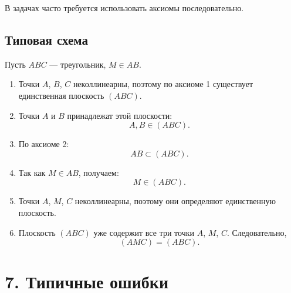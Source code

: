 \documentclass[a4paper,12pt]{article}
\newcommand{\plane}[1]{(#1)}
\begin{document}
В задачах часто требуется использовать аксиомы последовательно.

\subsection*{\textcolor{accent}{Типовая схема}}

Пусть $ABC$ --- треугольник, $M\in AB$.

\begin{enumerate}
  \item Точки $A$, $B$, $C$ неколлинеарны, поэтому по аксиоме 1 существует единственная плоскость $\plane{ABC}$.
  \item Точки $A$ и $B$ принадлежат этой плоскости:
  \[
  A,B\in\plane{ABC}.
  \]
  \item По аксиоме 2:
  \[
  AB\subset\plane{ABC}.
  \]
  \item Так как $M\in AB$, получаем:
  \[
  M\in\plane{ABC}.
  \]
  \item Точки $A$, $M$, $C$ неколлинеарны, поэтому они определяют единственную плоскость.
  \item Плоскость $\plane{ABC}$ уже содержит все три точки $A$, $M$, $C$. Следовательно,
  \[
  \boxed{\plane{AMC}=\plane{ABC}}.
  \]
\end{enumerate}


\section*{\textcolor{darkaccent}{7. Типичные ошибки}}
\end{document}
